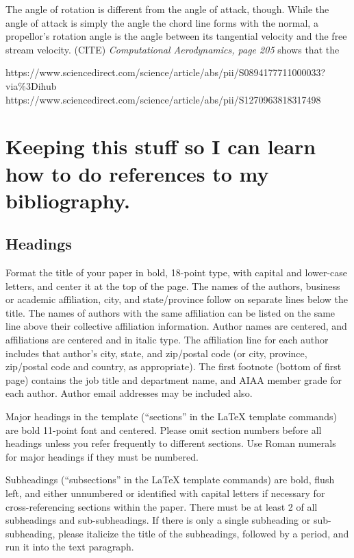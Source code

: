 \documentclass[journal ]{new-aiaa}
\begin{document}
The angle of rotation is different from the angle of attack, though. While the angle of attack is simply the angle the chord line forms with the normal, a propellor's rotation angle is the angle between its tangential velocity and the free stream velocity. (CITE) \emph{Computational Aerodynamics, page 205} shows that the 

https://www.sciencedirect.com/science/article/abs/pii/S0894177711000033?via\%3Dihub
https://www.sciencedirect.com/science/article/abs/pii/S1270963818317498






\section{Keeping this stuff so I can learn how to do references to my bibliography.}

\subsection{Headings}
Format the title of your paper in bold, 18-point type, with capital and lower-case letters, and center it at the top of the page. The names of the authors, business or academic affiliation, city, and state/province follow on separate lines below the title. The names of authors with the same affiliation can be listed on the same line above their collective affiliation information. Author names are centered, and affiliations are centered and in italic type. The affiliation line for each author includes that author’s city, state, and zip/postal code (or city, province, zip/postal code and country, as appropriate). The first footnote (bottom of first page) contains the job title and department name, and AIAA member grade for each author. Author email addresses may be included also.

Major headings in the template (``sections'' in the \LaTeX{} template commands) are bold 11-point font and centered. Please omit section numbers before all headings unless you refer frequently to different sections. Use Roman numerals for major headings if they must be numbered.

Subheadings (``subsections'' in the \LaTeX{} template commands) are bold, flush left, and either unnumbered or identified with capital letters if necessary for cross-referencing sections within the paper. There must be at least 2 of all subheadings and sub-subheadings. If there is only a single subheading or sub-subheading, please italicize the title of the subheadings, followed by a period, and run it into the text paragraph. 
\end{document}
